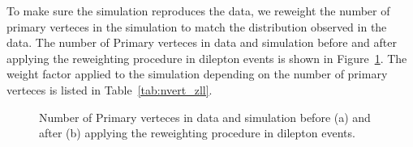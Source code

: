 To make sure the simulation reproduces the data, we reweight the number of
primary verteces in the simulation to match the distribution observed in the 
data. The number of Primary verteces in data and simulation before and
after applying the reweighting procedure in dilepton events is shown in
Figure~\ref{fig:nvert_zll}. The weight factor applied to the simulation 
depending on the number of primary verteces is listed in 
Table~\ref{tab:nvert_zll}.

\begin{figure}[!htbp]
\begin{center}
\caption{Number of Primary verteces in data and simulation before (a) and
after (b) applying the reweighting procedure in dilepton events.}
\label{fig:nvert_zll}
\end{center}
\end{figure}

